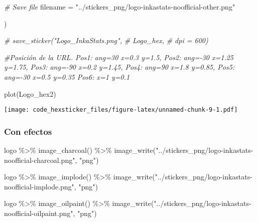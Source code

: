 \documentclass[
]{article}
\newenvironment{Shaded}{\begin{snugshade}}{\end{snugshade}}
\newcommand{\AttributeTok}[1]{\textcolor[rgb]{0.77,0.63,0.00}{#1}}
\newcommand{\CommentTok}[1]{\textcolor[rgb]{0.56,0.35,0.01}{\textit{#1}}}
\newcommand{\FunctionTok}[1]{\textcolor[rgb]{0.00,0.00,0.00}{#1}}
\newcommand{\NormalTok}[1]{#1}
\newcommand{\SpecialCharTok}[1]{\textcolor[rgb]{0.00,0.00,0.00}{#1}}
\newcommand{\StringTok}[1]{\textcolor[rgb]{0.31,0.60,0.02}{#1}}
\begin{document}
\begin{Shaded}
\begin{Highlighting}[]
    \CommentTok{\# Save file}
    \AttributeTok{filename             =} \StringTok{"../stickers\_png/logo{-}inkastats{-}noofficial{-}other.png"}
    
\NormalTok{  )  }

\CommentTok{\# save\_sticker("Logo\_InkaStats.png", }
\CommentTok{\#              Logo\_hex, }
\CommentTok{\#              dpi         = 600)}

\CommentTok{\#Posición de la URL. Pos1: ang=30 x=0.3 y=1.5, Pos2: ang={-}30 x=1.25 y=1.75, Pos3: ang={-}90 x=0.2 y=1.45, Pos4: ang=90 x=1.8 y=0.85, Pos5: ang={-}30 x=0.5 y=0.35 Pos6: x=1 y=0.1}

\FunctionTok{plot}\NormalTok{(Logo\_hex2)}
\end{Highlighting}
\end{Shaded}

\texttt{[image: code\_hexsticker\_files/figure-latex/unnamed-chunk-9-1.pdf]}

\hypertarget{con-efectos}{%
\subsubsection{Con efectos}\label{con-efectos}}

\begin{Shaded}
\begin{Highlighting}[]
\NormalTok{logo }\SpecialCharTok{\%\textgreater{}\%} 
  \FunctionTok{image\_charcoal}\NormalTok{() }\SpecialCharTok{\%\textgreater{}\%} 
  \FunctionTok{image\_write}\NormalTok{(}\StringTok{"../stickers\_png/logo{-}inkastats{-}noofficial{-}charcoal.png"}\NormalTok{, }\StringTok{"png"}\NormalTok{)}
\end{Highlighting}
\end{Shaded}

\begin{Shaded}
\begin{Highlighting}[]
\NormalTok{logo }\SpecialCharTok{\%\textgreater{}\%} 
  \FunctionTok{image\_implode}\NormalTok{() }\SpecialCharTok{\%\textgreater{}\%} 
  \FunctionTok{image\_write}\NormalTok{(}\StringTok{"../stickers\_png/logo{-}inkastats{-}noofficial{-}implode.png"}\NormalTok{, }\StringTok{"png"}\NormalTok{)}
\end{Highlighting}
\end{Shaded}

\begin{Shaded}
\begin{Highlighting}[]
\NormalTok{logo }\SpecialCharTok{\%\textgreater{}\%} 
  \FunctionTok{image\_oilpaint}\NormalTok{() }\SpecialCharTok{\%\textgreater{}\%} 
  \FunctionTok{image\_write}\NormalTok{(}\StringTok{"../stickers\_png/logo{-}inkastats{-}noofficial{-}oilpaint.png"}\NormalTok{, }\StringTok{"png"}\NormalTok{)}
\end{Highlighting}
\end{Shaded}
\end{document}
